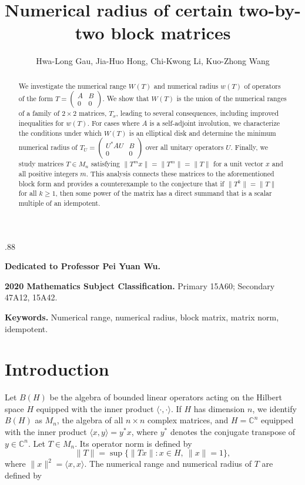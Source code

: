 \documentclass[11pt]{article}
\numberwithin{equation}{section}
\def\IC{{\mathbb C}}
\def\la{\langle}
\def\ra{\rangle}
\begin{document}
\openup .88\jot
\title{Numerical radius of certain two-by-two block matrices}
\author{Hwa-Long Gau, Jia-Huo Hong, Chi-Kwong Li, Kuo-Zhong Wang}
\date{}
\maketitle

\centerline{\bf Dedicated to Professor Pei Yuan Wu.}


\begin{abstract}
We investigate the numerical range $W(T)$ and numerical radius $w(T)$ of operators of the form
$T = \begin{pmatrix} A & B \\ 0 & 0 \end{pmatrix}$. We show that $W(T)$ is the union of the
numerical ranges of a family of $2\times 2$ matrices, $T_x$, leading to several consequences,
including improved inequalities for $w(T)$. For cases where $A$ is a self-adjoint involution,
we characterize the conditions under which $W(T)$ is an elliptical disk and determine the minimum
numerical radius of $T_U = \begin{pmatrix} U^*AU & B \\ 0 & 0 \end{pmatrix}$ over all unitary operators
$U$. Finally, we study matrices $T \in M_n$ satisfying $\|T^m x\| = \|T^m\| = \|T\|$ for a unit vector
$x$ and all positive integers $m$. This analysis connects these matrices to the aforementioned block form and
provides a counterexample to the conjecture that if $\|T^k\| = \|T\|$ for all $k \ge 1$, then some power
of the matrix has a direct summand that is a scalar multiple of an idempotent.
\end{abstract}

\noindent \textbf{2020 Mathematics Subject Classification.} Primary 15A60; Secondary 47A12, 15A42.

\noindent \textbf{Keywords.} Numerical range, numerical radius, block matrix, matrix norm, idempotent.

\section{Introduction}




Let $B(H)$ be the algebra of bounded linear operators
acting on the Hilbert space $H$ equipped with the inner product $\la \cdot, \cdot \ra$.
If $H$ has dimension $n$, we identify $B(H)$ as $M_n$,
the algebra of all $n \times n$ complex matrices, and
$H = \IC^n$ equipped with the inner product $\la x, y\ra = y^*x$,
where $y^*$ denotes the conjugate transpose of $y \in \IC^n$.
Let $T \in M_n$. Its operator norm is defined by
\[
\|T\| = \sup \{ \|Tx\| : x \in H,\ \|x\| = 1 \},
\]
where $\|x\|^2 = \langle x, x \rangle$. The numerical range and numerical radius of $T$ are defined
by
\end{document}

